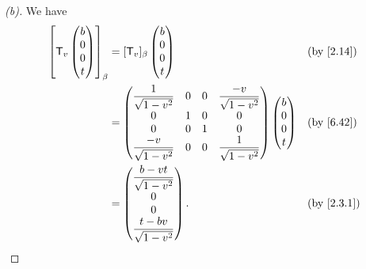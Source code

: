 \begin{proof}[(b)]
  We have
  \begin{align*}
    \br{\T_v\begin{pmatrix}
                b \\
                0 \\
                0 \\
                t
              \end{pmatrix}}_{\beta} & = [\T_v]_{\beta} \begin{pmatrix}
                                                        b \\
                                                        0 \\
                                                        0 \\
                                                        t
                                                      \end{pmatrix}                                                     &  & \by{2.14} \\
                            & = \begin{pmatrix}
                                  \dfrac{1}{\sqrt{1 - v^2}}  & 0 & 0 & \dfrac{-v}{\sqrt{1 - v^2}} \\
                                  0                          & 1 & 0 & 0                          \\
                                  0                          & 0 & 1 & 0                          \\
                                  \dfrac{-v}{\sqrt{1 - v^2}} & 0 & 0 & \dfrac{1}{\sqrt{1 - v^2}}
                                \end{pmatrix} \begin{pmatrix}
                                                b \\
                                                0 \\
                                                0 \\
                                                t
                                              \end{pmatrix} &  & \by{6.42}                      \\
                            & = \begin{pmatrix}
                                  \dfrac{b - vt}{\sqrt{1 - v^2}} \\
                                  0                              \\
                                  0                              \\
                                  \dfrac{t - bv}{\sqrt{1 - v^2}}
                                \end{pmatrix}.                                           &  & \by{2.3.1}
  \end{align*}
\end{proof}

